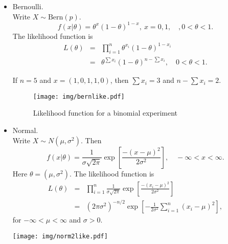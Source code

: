 \documentclass[captions=tableheading]{scrbook}
\begin{document}
\begin{itemize}

\item Bernoulli.\\
\label{sec-1_1_1_1}%
Write $X \sim \mathrm{Bern}(p)$.
\[
f(x|\theta) = \theta^{x}(1-\theta)^{1-x},\ x=0,1,\quad, 0 < \theta < 1.
\]
The likelihood function is
\begin{eqnarray*}
L(\theta) & = & \prod_{i=1}^{n}\theta^{x_{i}}(1-\theta)^{1-x_{i}}\\
 & = & \theta^{\sum x_{i}}(1-\theta)^{n-\sum x_{i}},\quad0<\theta<1.
\end{eqnarray*}

If $n = 5$ and $x = (1,0,1,1,0)$, then $\sum x_{i}=3$ and $n - \sum x_{i}=2$.

\begin{center}

\begin{figure}[h!]
\centering
\texttt{[image: img/bernlike.pdf]}
\caption{Likelihood function for a binomial experiment}
\end{figure}

\end{center}


\item Normal.\\
\label{sec-1_1_1_2}%
Write $X\sim N(\mu,\sigma^2)$. Then 
\[
f(x|\theta) = \frac{1}{\sigma\sqrt{2\pi}}\exp\left[\frac{-(x-\mu)^{2}}{2\sigma^{2}}\right],\quad-\infty<x<\infty.
\]
Here $\theta = (\mu,\sigma^2)$.  The likelihood function is
\begin{eqnarray*}
L(\theta) & = & \prod_{i=1}^{n}\frac{1}{\sigma\sqrt{2\pi}}\exp\left[\frac{-(x_{i}-\mu)^{2}}{2\sigma^{2}}\right]\\
 & = & (2\pi\sigma^{2})^{-n/2}\exp\left[-\frac{1}{2\sigma^{2}}\sum_{i=1}^{n}(x_{i}-\mu)^{2}\right],
\end{eqnarray*}
for $-\infty < \mu < \infty$ and $\sigma > 0$.

\begin{center}

\texttt{[image: img/norm2like.pdf]}

\end{center}

\end{itemize} %
\end{document}
